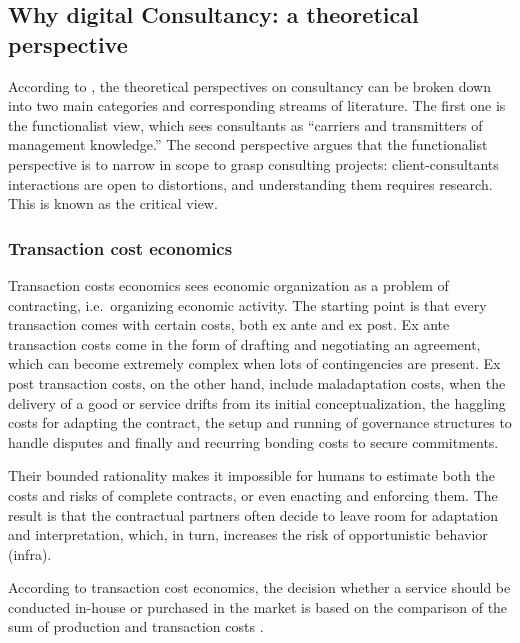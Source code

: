 \documentclass[12pt]{article}
\begin{document}
\hypertarget{why-digital-consultancy-a-theoretical-perspective}{%
\subsection{Why digital Consultancy: a theoretical
perspective}\label{why-digital-consultancy-a-theoretical-perspective}}

According to \citet[3-6]{armbruster2006}, the theoretical perspectives
on consultancy can be broken down into two main categories and
corresponding streams of literature. The first one is the functionalist
view, which sees consultants as ``carriers and transmitters of
management knowledge.'' The second perspective argues that the
functionalist perspective is to narrow in scope to grasp consulting
projects: client-consultants interactions are open to distortions, and
understanding them requires research. This is known as the critical
view.

\hypertarget{transaction-cost-economics}{%
\subsubsection{Transaction cost
economics}\label{transaction-cost-economics}}

Transaction costs economics sees economic organization as a problem of
contracting, i.e.~organizing economic activity. The starting point is
that every transaction comes with certain costs, both ex ante and ex
post. Ex ante transaction costs come in the form of drafting and
negotiating an agreement, which can become extremely complex when lots
of contingencies are present. Ex post transaction costs, on the other
hand, include maladaptation costs, when the delivery of a good or
service drifts from its initial conceptualization, the haggling costs
for adapting the contract, the setup and running of governance
structures to handle disputes and finally and recurring bonding costs to
secure commitments.

Their bounded rationality makes it impossible for humans to estimate
both the costs and risks of complete contracts, or even enacting and
enforcing them. \citep[ 53]{aubert1996} The result is that the
contractual partners often decide to leave room for adaptation and
interpretation, which, in turn, increases the risk of opportunistic
behavior (infra).

According to transaction cost economics, the decision whether a service
should be conducted in-house or purchased in the market is based on the
comparison of the sum of production and transaction costs \citep[
12]{armbruster2006}.
\end{document}
